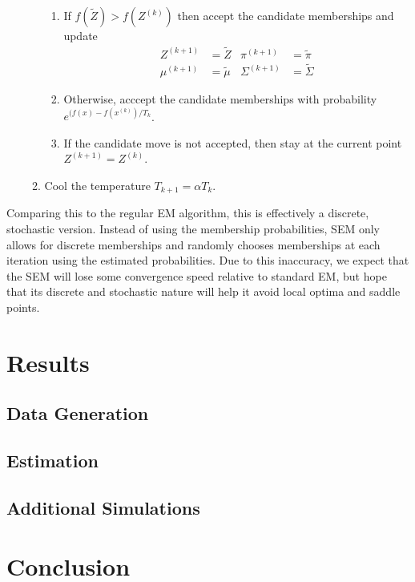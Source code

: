 \documentclass{article}
\theoremstyle{definition}
\theoremstyle{algodesc}
\begin{document}
\begin{enumerate}
\begin{enumerate}
    \begin{enumerate}
    \item If $f(\tilde{Z}) > f(Z^{(k)})$ then accept the candidate memberships and update
      \begin{align*}
      Z^{(k+1)} &= \tilde{Z} & \pi^{(k+1)} &= \tilde{\pi} \\
      \mu^{(k+1)} &= \tilde{\mu} & \Sigma^{(k+1)} &= \tilde{\Sigma}
      \end{align*}
    \item Otherwise, acccept the candidate memberships with probability $e^{(f(x) - f(x^{(k)})/T_k}$.
    \item If the candidate move is not accepted, then stay at the current point $Z^{(k+1)} = Z^{(k)}$.
    \end{enumerate}
  \item Cool the temperature $T_{k+1} = \alpha T_{k}$.
  \end{enumerate}
\end{enumerate}

Comparing this to the regular EM algorithm, this is effectively a discrete, stochastic version. Instead of using the membership probabilities, SEM only allows for discrete memberships and randomly chooses memberships at each iteration using the estimated probabilities. Due to this inaccuracy, we expect that the SEM will lose some convergence speed relative to standard EM, but hope that its discrete and stochastic nature will help it avoid local optima and saddle points.



\section{Results}


\subsection{Data Generation}
\subsection{Estimation}
\subsection{Additional Simulations}

\section{Conclusion}





\end{document}
